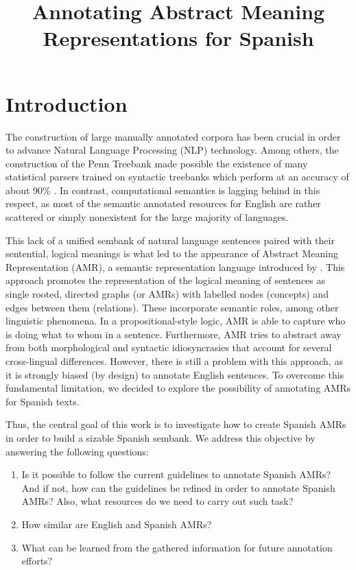\documentclass[10pt, a4paper]{article}
\title{Annotating Abstract Meaning Representations for Spanish}
\begin{document}
\maketitleabstract

\section{Introduction}

The construction of large manually annotated corpora has been crucial in order to advance Natural Language Processing (NLP) technology. Among others, the construction of the Penn Treebank \cite{marcus_building_1993} made possible the existence of many statistical parsers trained on syntactic treebanks which perform at an accuracy of about 90\% \cite{charniak_coarse--fine_2005}. In contrast, computational semantics is lagging behind in this respect, as most of the semantic annotated resources for English are rather scattered or simply nonexistent for the large majority of languages.

This lack of a unified sembank of natural language sentences paired with their sentential, logical meanings is what led to the appearance of Abstract Meaning Representation (AMR), a semantic representation language introduced by \cite{banarescu2013abstract}. This approach promotes the representation of the logical meaning of sentences as single rooted, directed graphs (or AMRs) with labelled nodes (concepts) and edges between them (relations). These incorporate semantic roles, among other linguistic phenomena. In a propositional-style logic, AMR is able to capture who is doing what to whom in a sentence. Furthermore, AMR tries to abstract away from both morphological and syntactic idiosyncrasies that account for several cross-lingual differences. However, there is still a problem with this approach, as it is strongly biased (by design) to annotate English sentences. To overcome this fundamental limitation, we decided to explore the possibility of annotating AMRs for Spanish texts.

Thus, the central goal of this work is to investigate how to create Spanish AMRs in order to build a sizable Spanish sembank. We address this objective by answering the following questions:

\begin{enumerate}
\item Is it possible to follow the current guidelines to annotate Spanish AMRs? And if not, how can the guidelines be refined in order to annotate Spanish AMRs? Also, what resources do we need to carry out such task?
\item How similar are English and Spanish AMRs?
\item What can be learned from the gathered information for future annotation efforts?
\end{enumerate}
\end{document}
